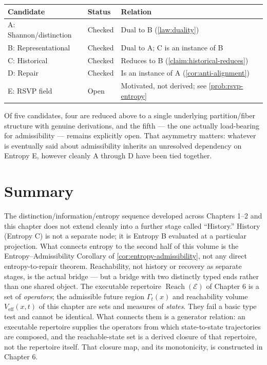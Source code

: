 \documentclass[12pt]{report}
\newcommand{\Reach}{\ensuremath{\operatorname{Reach}}}
\begin{document}
\begin{center}
\begin{tabular}{lll}
\hline
Candidate & Status & Relation \\
\hline
A: Shannon/distinction & Checked & Dual to B (\cref{law:duality}) \\
B: Representational & Checked & Dual to A; C is an instance of B \\
C: Historical & Checked & Reduces to B (\cref{claim:historical-reduces}) \\
D: Repair & Checked & Is an instance of A (\cref{cor:anti-alignment}) \\
E: RSVP field & Open & Motivated, not derived; see \cref{prob:rsvp-entropy} \\
\hline
\end{tabular}
\end{center}

Of five candidates, four are reduced above to a single underlying
partition/fiber structure with genuine derivations, and the fifth ---
the one actually load-bearing for admissibility --- remains explicitly
open. That asymmetry matters: whatever is eventually said about
admissibility inherits an unresolved dependency on Entropy E, however
cleanly A through D have been tied together.

\section*{Summary}
\label{sec:bridge-forward}

The distinction/information/entropy sequence developed across Chapters
1--2 and this chapter does not extend cleanly into a further stage
called ``History.'' History (Entropy C) is not a separate node; it is
Entropy B evaluated at a particular projection. What connects entropy to
the second half of this volume is the Entropy--Admissibility Corollary
of \cref{cor:entropy-admissibility}, not any direct entropy-to-repair
theorem. Reachability, not history or recovery as separate stages, is
the actual bridge --- but a bridge with two distinctly typed ends rather
than one shared object. The executable repertoire $\Reach(\mathcal{E})$
of Chapter 6 is a set of \emph{operators}; the admissible future region
$\Gamma_t(x)$ and reachability volume $V_{\mathrm{eff}}(x,t)$ of this
chapter are sets and measures of \emph{states}. They fail a basic type
test and cannot be identical. What connects them is a generator
relation: an executable repertoire supplies the operators from which
state-to-state trajectories are composed, and the reachable-state set is
a derived closure of that repertoire, not the repertoire itself. That
closure map, and its monotonicity, is constructed in Chapter 6.
\end{document}
